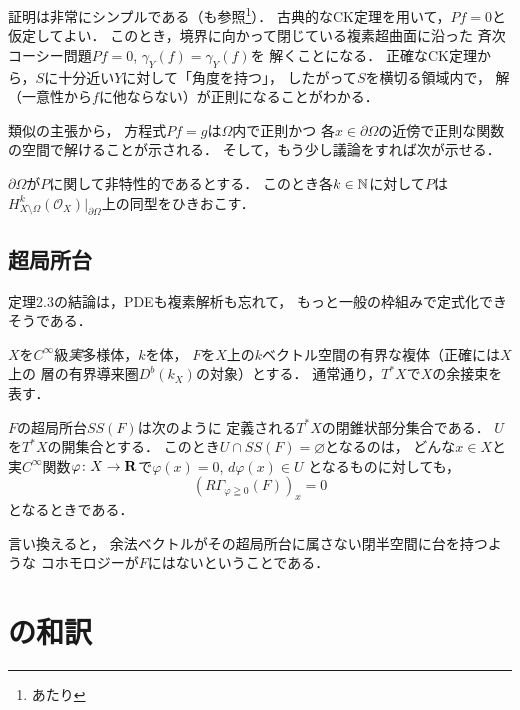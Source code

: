 証明は非常にシンプルである（\cite{Hor83}も参照\footnote{\cite[Theorem 9.4.7]{Hor83}あたり}）．
古典的なCK定理を用いて，\(Pf=0\)と仮定してよい．
このとき，境界に向かって閉じている複素超曲面に沿った
斉次コーシー問題\(Pf=0\), \(\gamma_{Y}(f)=\gamma_{Y}(f)\)を
解くことになる．
正確なCK定理から，\(S\)に十分近い\(Y\)に対して「角度を持つ」，
したがって\(S\)を横切る領域内で，
解（一意性から\(f\)に他ならない）が正則になることがわかる．

類似の主張から，
方程式\(Pf=g\)は\(\Omega\)内で正則かつ
各\(x\in\partial\Omega\)の近傍で正則な関数の空間で解けることが示される．
そして，もう少し議論をすれば次が示せる．
\begin{THM}
    \(\partial\Omega\)が\(P\)に関して非特性的であるとする．
    このとき各\(k\in\mathbb{N}\)に対して\(P\)は\(
        H^{k}_{X\setminus\Omega}(\mathcal{O}_{X})\rvert_{\partial\Omega}
    \)上の同型をひきおこす．
\end{THM}

\subsection{超局所台}

定理2.3の結論は，PDEも複素解析も忘れて，
もっと一般の枠組みで定式化できそうである．

\(X\)を\(C^{\infty}\)級\emph{実}多様体，\(k\)を体，
\(F\)を\(X\)上の\(k\)ベクトル空間の有界な複体（正確には\(X\)上の
層の有界導来圏\(D^{b}(k_X)\)の対象）とする．
通常通り，\(T^{\ast}X\)で\(X\)の余接束を表す．

\newcommand{\cotb}[1][]{T^{\ast}{#1}}
\newcommand{\conm}[2][]{T_{#1}^{\hspace{0.7pt}\ast}{#2}}
\newcommand{\norb}[2][]{T_{#1}{#2}}
\begin{DFN}
    \(F\)の超局所台\(SS(F)\)は次のように
    定義される\(T^{\ast}X\)の閉錐状部分集合である．
    \(U\)を\(\cotb[X]\)の開集合とする．
    このとき\(U\cap SS(F)=\varnothing\)となるのは，
    どんな\(x\in X\)と実\(C^{\infty}\)関数\(
        \varphi\colon X\to \mathbf{R}
    \)で\(\varphi(x)=0\), \(d\varphi(x)\in U\)
    となるものに対しても，\[
        \left(R\varGamma_{\varphi\geqq0}(F)\right)_{x}=0
    \]となるときである．
\end{DFN}

言い換えると，
余法ベクトルがその超局所台に属さない閉半空間に台を持つような
コホモロジーが\(F\)にはないということである．




\section{\cite[9.4]{Hor83}の和訳}
